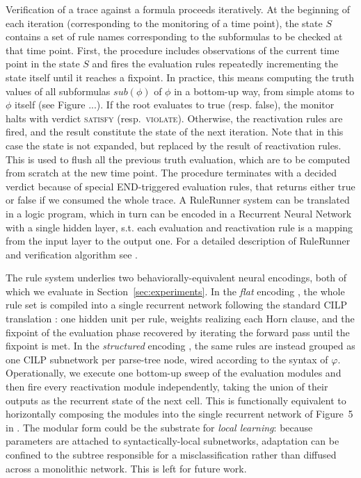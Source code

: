 
Verification of a trace against a formula proceeds iteratively. At the beginning of each iteration (corresponding to the monitoring of a time point), the state $S$ contains a set of rule names corresponding to the subformulas to be checked at that time point. First, the procedure includes observations of the current time point in the state $S$ and fires the evaluation rules repeatedly incrementing the state itself until it reaches a fixpoint. In practice, this means computing the truth values of all subformulas $sub(\phi)$ of $\phi$ in a bottom-up way, from simple atoms to $\phi$ itself (see Figure ...). If the root evaluates to true (resp. false), the monitor halts with verdict \textsc{satisfy} (resp.\ \textsc{violate}). Otherwise, the reactivation rules are fired, and the result constitute the state of the next iteration. Note that in this case the state is not expanded, but replaced by the result of reactivation rules. This is used to flush all the previous truth evaluation, which are to be computed from scratch at the new time point. The procedure terminates with a decided verdict because of special END-triggered evaluation rules, that returns either true or false if we consumed the whole trace.
A RuleRunner system can be translated in a logic program, which in turn can be encoded in a Recurrent Neural Network with a single hidden layer, s.t. each evaluation and reactivation rule is a mapping from the input layer to the output one. For a detailed description of RuleRunner and verification algorithm see \cite{perotti2014neural,perotti2015runtime}.

The rule system underlies two behaviorally-equivalent neural encodings, both of which we evaluate in Section~\ref{sec:experiments}. In the \emph{flat} encoding \cite{perotti2014neural}, the whole rule set is compiled into a single recurrent network following the standard CILP translation \cite{}: one hidden unit per rule, weights realizing each Horn clause, and the fixpoint of the evaluation phase recovered by iterating the forward pass until the fixpoint is met. 
In the \emph{structured} encoding \cite{perotti2015neural}, the same rules are instead grouped as one CILP subnetwork per parse-tree node, wired according to the syntax of $\varphi$. Operationally, we execute one bottom-up sweep of the evaluation modules and then fire every reactivation module independently, taking the union of their outputs as the recurrent state of the next cell. This is functionally equivalent to horizontally composing the modules into the single recurrent network of Figure~5 in \cite{perotti2015neural}. The modular form could be the substrate for \emph{local learning}: because parameters are attached to syntactically-local subnetworks, adaptation can be confined to the subtree responsible for a misclassification rather than diffused across a monolithic network. This is left for future work.



